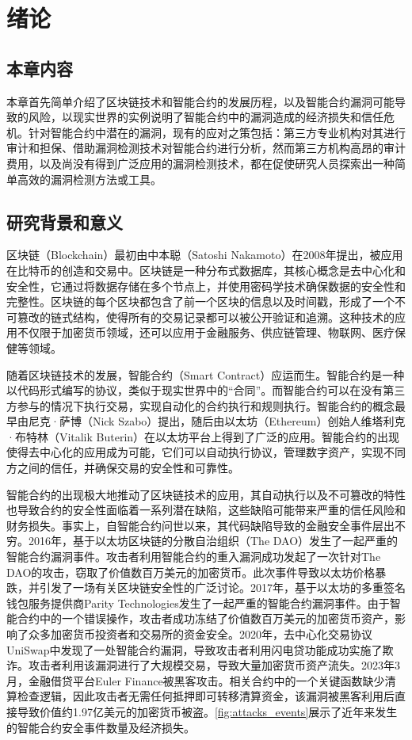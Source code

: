 \chapter{绪论}
\section{本章内容}
\label{sec:本章内容1}
本章首先简单介绍了区块链技术和智能合约的发展历程，以及智能合约漏洞可能导致的风险，以现实世界的实例说明了智能合约中的漏洞造成的经济损失和信任危机。针对智能合约中潜在的漏洞，现有的应对之策包括：第三方专业机构对其进行审计和担保、借助漏洞检测技术对智能合约进行分析，然而第三方机构高昂的审计费用，以及尚没有得到广泛应用的漏洞检测技术，都在促使研究人员探索出一种简单高效的漏洞检测方法或工具。


\section{研究背景和意义}
\label{sec:研究背景和意义}

区块链（Blockchain）最初由中本聪（Satoshi Nakamoto）在2008年提出\cite{nakamoto2008bitcoin}，被应用在比特币的创造和交易中。区块链是一种分布式数据库，其核心概念是去中心化和安全性，它通过将数据存储在多个节点上，并使用密码学技术确保数据的安全性和完整性。区块链的每个区块都包含了前一个区块的信息以及时间戳，形成了一个不可篡改的链式结构，使得所有的交易记录都可以被公开验证和追溯。这种技术的应用不仅限于加密货币领域，还可以应用于金融服务、供应链管理、物联网、医疗保健等领域。

随着区块链技术的发展，智能合约（Smart Contract）应运而生。智能合约是一种以代码形式编写的协议，类似于现实世界中的“合同”。而智能合约可以在没有第三方参与的情况下执行交易，实现自动化的合约执行和规则执行。智能合约的概念最早由尼克·萨博（Nick Szabo）提出，随后由以太坊（Ethereum）创始人维塔利克·布特林（Vitalik Buterin）在以太坊平台上得到了广泛的应用。智能合约的出现使得去中心化的应用成为可能，它们可以自动执行协议，管理数字资产，实现不同方之间的信任，并确保交易的安全性和可靠性。

智能合约的出现极大地推动了区块链技术的应用，其自动执行以及不可篡改的特性也导致合约的安全性面临着一系列潜在缺陷，这些缺陷可能带来严重的信任风险和财务损失。事实上，自智能合约问世以来，其代码缺陷导致的金融安全事件层出不穷。2016年，基于以太坊区块链的分散自治组织（The DAO）发生了一起严重的智能合约漏洞事件。攻击者利用智能合约的重入漏洞成功发起了一次针对The DAO的攻击，窃取了价值数百万美元的加密货币。此次事件导致以太坊价格暴跌，并引发了一场有关区块链安全性的广泛讨论。2017年，基于以太坊的多重签名钱包服务提供商Parity Technologies发生了一起严重的智能合约漏洞事件。由于智能合约中的一个错误操作，攻击者成功冻结了价值数百万美元的加密货币资产，影响了众多加密货币投资者和交易所的资金安全\cite{niyuandong}。2020年，去中心化交易协议UniSwap中发现了一处智能合约漏洞，导致攻击者利用闪电贷功能成功实施了欺诈。攻击者利用该漏洞进行了大规模交易，导致大量加密货币资产流失。2023年3月，金融借贷平台Euler Finance被黑客攻击。相关合约中的一个关键函数缺少清算检查逻辑，因此攻击者无需任何抵押即可转移清算资金，该漏洞被黑客利用后直接导致价值约1.97亿美元的加密货币被盗。\autoref{fig:attacks_events}展示了近年来发生的智能合约安全事件数量及经济损失。

